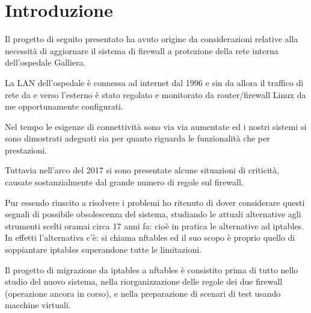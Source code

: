 

\chapter{Introduzione} %

\label{Chapter1} %


\newcommand{\keyword}[1]{\textbf{#1}}
\newcommand{\tabhead}[1]{\textbf{#1}}
\newcommand{\code}[1]{\texttt{#1}}
\newcommand{\file}[1]{\texttt{\bfseries#1}}
\newcommand{\option}[1]{\texttt{\itshape#1}}


Il progetto di seguito presentato ha avuto origine da considerazioni
relative alla necessit\`a di aggiornare il sistema di firewall a protezione
della rete interna dell'ospedale Galliera.

La LAN dell'ospedale \`e connessa ad internet dal 1996 e sin da allora il
traffico di rete da e verso l'esterno \`e stato regolato e monitorato da
router/firewall Linux da me opportunamente configurati.

Nel tempo le esigenze di connettivit\`a sono via via aumentate ed i nostri
sistemi si sono dimostrati adeguati sia per quanto riguarda le funzionalit\`a
che per prestazioni.

Tuttavia nell'arco del 2017 si sono presentate alcune situazioni di
criticit\`a, causate sostanzialmente dal grande numero di regole sul firewall.

Pur essendo riuscito a risolvere i problemi ho ritenuto di dover considerare
questi segnali di possibile obsolescenza del sistema, studiando le attuali
alternative agli strumenti scelti oramai circa 17 anni fa: cio\`e in pratica
le alternative ad iptables.  In effetti l'alternativa c'\`e: si chiama
nftables ed il suo scopo è proprio quello di soppiantare iptables
superandone tutte le limitazioni.

Il progetto di migrazione da iptables a nftables \`e consistito prima di
tutto nello studio del nuovo sistema, nella riorganizzazione delle regole dei
due firewall (operazione ancora in corso), e nella preparazione di scenari di
test usando macchine virtuali.

